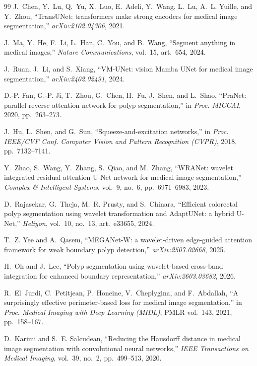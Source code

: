 \documentclass[journal]{IEEEtran}
\begin{document}
\begin{thebibliography}{99}
J.~Chen, Y.~Lu, Q.~Yu, X.~Luo, E.~Adeli, Y.~Wang, L.~Lu, A.~L. Yuille, and Y.~Zhou, ``TransUNet: transformers make strong encoders for medical image segmentation,'' \emph{arXiv:2102.04306}, 2021.

J.~Ma, Y.~He, F.~Li, L.~Han, C.~You, and B.~Wang, ``Segment anything in medical images,'' \emph{Nature Communications}, vol.~15, art.~654, 2024.

J.~Ruan, J.~Li, and S.~Xiang, ``VM-UNet: vision Mamba UNet for medical image segmentation,'' \emph{arXiv:2402.02491}, 2024.

D.-P. Fan, G.-P. Ji, T.~Zhou, G.~Chen, H.~Fu, J.~Shen, and L.~Shao, ``PraNet: parallel reverse attention network for polyp segmentation,'' in \emph{Proc. MICCAI}, 2020, pp.~263--273.

J.~Hu, L.~Shen, and G.~Sun, ``Squeeze-and-excitation networks,'' in \emph{Proc. IEEE/CVF Conf. Computer Vision and Pattern Recognition (CVPR)}, 2018, pp.~7132--7141.

Y.~Zhao, S.~Wang, Y.~Zhang, S.~Qiao, and M.~Zhang, ``WRANet: wavelet integrated residual attention U-Net network for medical image segmentation,'' \emph{Complex \& Intelligent Systems}, vol.~9, no.~6, pp.~6971--6983, 2023.

D.~Rajasekar, G.~Theja, M.~R. Prusty, and S.~Chinara, ``Efficient colorectal polyp segmentation using wavelet transformation and AdaptUNet: a hybrid U-Net,'' \emph{Heliyon}, vol.~10, no.~13, art.~e33655, 2024.

T.~Z. Yee and A.~Qasem, ``MEGANet-W: a wavelet-driven edge-guided attention framework for weak boundary polyp detection,'' \emph{arXiv:2507.02668}, 2025.

H.~Oh and J.~Lee, ``Polyp segmentation using wavelet-based cross-band integration for enhanced boundary representation,'' \emph{arXiv:2603.03682}, 2026.

R.~El~Jurdi, C.~Petitjean, P.~Honeine, V.~Cheplygina, and F.~Abdallah, ``A surprisingly effective perimeter-based loss for medical image segmentation,'' in \emph{Proc. Medical Imaging with Deep Learning (MIDL)}, PMLR vol.~143, 2021, pp.~158--167.

D.~Karimi and S.~E. Salcudean, ``Reducing the Hausdorff distance in medical image segmentation with convolutional neural networks,'' \emph{IEEE Transactions on Medical Imaging}, vol.~39, no.~2, pp.~499--513, 2020.


\end{thebibliography}
\end{document}

